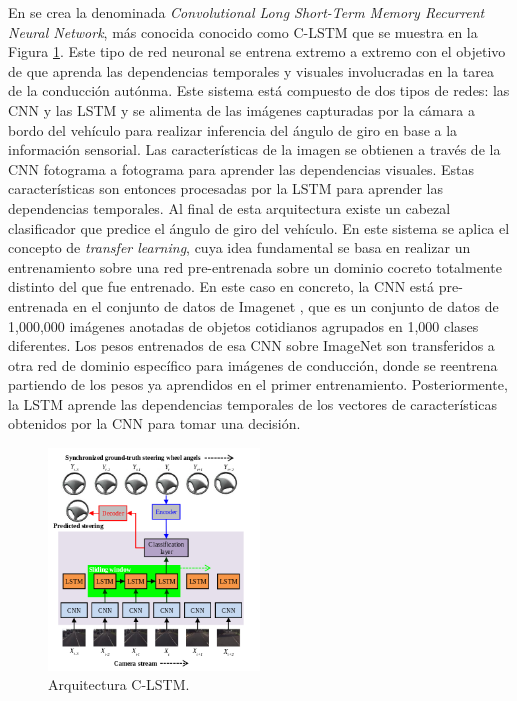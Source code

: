 En \cite{temporal-dependencies} se crea la denominada \textit{Convolutional Long Short-Term Memory Recurrent Neural Network}, más conocida conocido como C-LSTM que se muestra en la Figura \ref{fig.clstm}. Este tipo de red neuronal se entrena extremo a extremo con el objetivo de que aprenda las dependencias temporales y visuales involucradas en la tarea de la conducción autónma. Este sistema está compuesto de dos tipos de redes: las CNN y las LSTM y se alimenta de las imágenes capturadas por la cámara a bordo del vehículo para realizar inferencia del ángulo de giro en base a la información sensorial. Las características de la imagen se obtienen a través de la CNN fotograma a fotograma para aprender las dependencias visuales. Estas características son entonces procesadas por la LSTM para aprender las dependencias temporales. Al final de esta arquitectura existe un cabezal clasificador que predice el ángulo de giro del vehículo. En este sistema se aplica el concepto de \textit{transfer learning}, cuya idea fundamental se basa en realizar un entrenamiento sobre una red pre-entrenada sobre un dominio cocreto totalmente distinto del que fue entrenado. En este caso en concreto, la CNN está pre-entrenada en el conjunto de datos de Imagenet \cite{imagenet}, que es un conjunto de datos de 1,000,000 imágenes anotadas de objetos cotidianos agrupados en 1,000 clases diferentes. Los pesos entrenados de esa CNN sobre ImageNet son transferidos a otra red de dominio específico para imágenes de conducción, donde se reentrena partiendo de los pesos ya aprendidos en el primer entrenamiento. Posteriormente, la LSTM aprende las dependencias temporales de los vectores de características obtenidos por la CNN para tomar una decisión. 

\begin{figure}
\begin{center}
	\includegraphics[width=0.5\textwidth]{img/clstm.png}
   \caption{Arquitectura C-LSTM.}
	\label{fig.clstm}
\end{center}
\end{figure}

